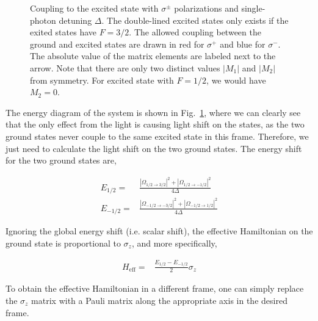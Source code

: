 \documentclass[10pt,fleqn]{article}
\newcommand{\eqar}[1]
{
  \begin{align}
    #1
  \end{align}
}
\newcommand{\abs}[1]{{\left|{#1}\right|}}
\begin{document}
\begin{figure}[h]
  \centering
  \caption{Coupling to the excited state with $\sigma^\pm$ polarizations
    and single-photon detuning $\Delta$.
    The double-lined excited states only exists if the exited states have $F=3/2$.
    The allowed coupling between the ground and excited states are drawn in
    {\color{red} red for $\sigma^+$} and {\color{blue} blue for $\sigma^-$}.
    The absolute value of the matrix elements are labeled next to the arrow.
    Note that there are only two distinct values $\abs{M_1}$ and $\abs{M_2}$
    from symmetry. For excited state with $F=1/2$, we would have $M_2=0$.}
  \label{fig:sigma-couple}
\end{figure}

The energy diagram of the system is shown in Fig.~\ref{fig:sigma-couple},
where we can clearly see that the only effect from the light is causing light shift
on the states, as the two ground states never couple to the same excited state
in this frame. Therefore, we just need to calculate the light shift
on the two ground states. The energy shift for the two ground states are,
\eqar{
  E_{1/2}=&\frac{\abs{\Omega_{1/2\rightarrow3/2}}^2+\abs{\Omega_{1/2\rightarrow-1/2}}^2}{4\Delta}\\
  E_{-1/2}=&\frac{\abs{\Omega_{-1/2\rightarrow-3/2}}^2+\abs{\Omega_{-1/2\rightarrow1/2}}^2}{4\Delta}
}
Ignoring the global energy shift (i.e. scalar shift),
the effective Hamiltonian on the ground state is proportional to $\sigma_z$,
and more specifically,
\eqar{
  H_{\mathrm{eff}}=&\frac{E_{1/2}-E_{-1/2}}{2}\sigma_z\label{eq:eff-origin}
}
To obtain the effective Hamiltonian in a different frame,
one can simply replace the $\sigma_z$ matrix with a Pauli matrix
along the appropriate axis in the desired frame.\\
\end{document}
